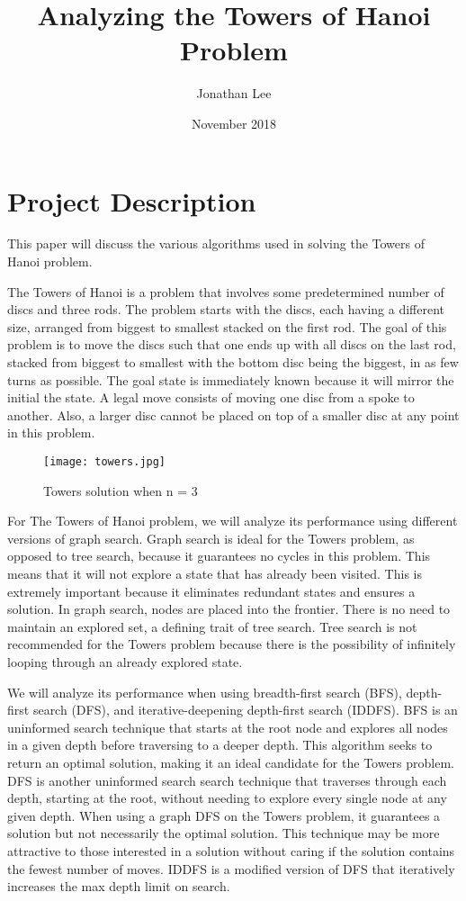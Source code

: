 \documentclass[11pt]{article}
\title{\vspace{-2.5cm} Analyzing the Towers of Hanoi Problem }
\author{Jonathan Lee}
\date{November 2018}
\begin{document}
\maketitle

\section{Project Description}
This paper will discuss the various algorithms used in solving the Towers of Hanoi problem.  

The Towers of Hanoi is a problem that involves some predetermined number of discs and three rods. The problem starts with the discs, each having a different size, arranged from biggest to smallest stacked on the first rod. The goal of this problem is to move the discs such that one ends up with all discs on the last rod, stacked from biggest to smallest with the bottom disc being the biggest, in as few turns as possible. The goal state is immediately known because it will mirror the initial the state. A legal move consists of moving one disc from a spoke to another. Also, a larger disc cannot be placed on top of a smaller disc at any point in this problem.  

\begin{figure}[!h]
{\centering
\texttt{[image: towers.jpg]}
\caption{Towers solution when n = 3}
\label{tower_frontier}
}
\vspace*{5mm}
\end{figure}

For The Towers of Hanoi problem, we will analyze its performance using different versions of graph search. Graph search is ideal for the Towers problem, as opposed to tree search, because it guarantees no cycles in this problem. This means that it will not explore a state that has already been visited. This is extremely important because it eliminates redundant states and ensures a solution. In graph search, nodes are placed into the frontier. There is no need to maintain an explored set, a defining trait of tree search. Tree search is not recommended for the Towers problem because there is the possibility of infinitely looping through an already explored state.  

We will analyze its performance when using breadth-first search (BFS), depth-first search (DFS), and iterative-deepening depth-first search (IDDFS). BFS is an uninformed search technique that starts at the root node and explores all nodes in a given depth before traversing to a deeper depth. This algorithm seeks to return an optimal solution, making it an ideal candidate for the Towers problem. DFS is another uninformed search search technique that traverses through each depth, starting at the root, without needing to explore every single node at any given depth. When using a graph DFS on the Towers problem, it guarantees a solution but not necessarily the optimal solution. This technique may be more attractive to those interested in a solution without caring if the solution contains the fewest number of moves. IDDFS is a modified version of DFS that iteratively increases the max depth limit on search. 
\end{document}
